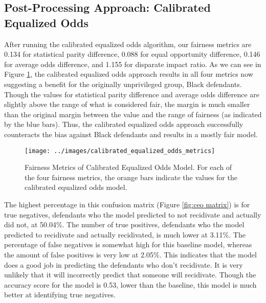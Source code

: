 \documentclass[,article,,moreauthors,pdftex]{mdpi}
\begin{document}
\hypertarget{post-processing-approach-calibrated-equalized-odds}{%
\subsection{Post-Processing Approach: Calibrated Equalized
Odds}\label{post-processing-approach-calibrated-equalized-odds}}

After running the calibrated equalized odds algorithm, our fairness
metrics are 0.134 for statistical parity difference, 0.088 for equal
opportunity difference, 0.146 for average odds difference, and 1.155 for
disparate impact ratio. As we can see in Figure \ref{fig:ceo metrics},
the calibrated equalized odds approach results in all four metrics now
suggesting a benefit for the originally unprivileged group, Black
defendants. Though the values for statistical parity difference and
average odds difference are slightly above the range of what is
considered fair, the margin is much smaller than the original margin
between the value and the range of fairness (as indicated by the blue
bars). Thus, the calibrated equalized odds approach successfully
counteracts the bias against Black defendants and results in a mostly
fair model.

\begin{figure}

{\centering \texttt{[image: ../images/calibrated\_equalized\_odds\_metrics]} 

}

\caption{Fairness Metrics of Calibrated Equalized Odds Model. For each of the four fairness metrics, the orange bars indicate the values for the calibrated equalized odds model.}\label{fig:ceo metrics}
\end{figure}

The highest percentage in this confusion matrix (Figure
\ref{fig:ceo matrix}) is for true negatives, defendants who the model
predicted to not recidivate and actually did not, at 50.04\%. The number
of true positives, defendants who the model predicted to recidivate and
actually recidivated, is much lower at 3.11\%. The percentage of false
negatives is somewhat high for this baseline model, whereas the amount
of false positives is very low at 2.05\%. This indicates that the model
does a good job in predicting the defendants who don't recidivate. It is
very unlikely that it will incorrectly predict that someone will
recidivate. Though the accuracy score for the model is 0.53, lower than
the baseline, this model is much better at identifying true negatives.
\end{document}
